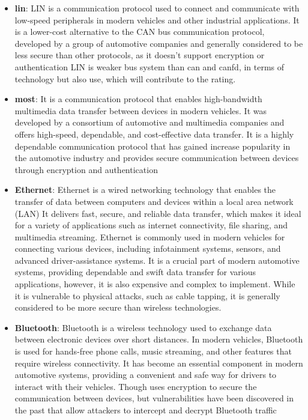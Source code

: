 \begin{itemize}
    \item \textbf{\gls{lin}}: LIN is a communication protocol used to connect and communicate with low-speed peripherals in modern vehicles and other industrial applications. 
    It is a lower-cost alternative to the CAN bus communication protocol, developed by a group of automotive companies 
    and generally considered to be less secure than other protocols, as it doesn't support encryption or authentication
    LIN is weaker bus system than \gls{can} and \gls{canfd}, in terms of technology but also use, which will contribute to the rating.
    
    \item \textbf{\gls{most}}: It is a communication protocol that enables high-bandwidth multimedia data transfer between devices in modern vehicles. 
    It was developed by a consortium of automotive and multimedia companies and offers high-speed, dependable, and cost-effective data transfer.
    It is a highly dependable communication protocol that has gained increase popularity in the automotive industry and
    provides secure communication between devices through encryption and authentication

    \item \textbf{Ethernet}: Ethernet is a wired networking technology that enables the transfer of data between computers and devices within a local area network (LAN)
    It delivers fast, secure, and reliable data transfer, which makes it ideal for a variety of applications such as internet connectivity, file sharing, and multimedia streaming.
    Ethernet is commonly used in modern vehicles for connecting various devices, including infotainment systems, sensors, and advanced driver-assistance systems. 
    It is a crucial part of modern automotive systems, providing dependable and swift data transfer for various applications, however, it is also expensive and complex to implement.
    While it is vulnerable to physical attacks, such as cable tapping, it is generally considered to be more secure than wireless technologies.

    \item \textbf{Bluetooth}: Bluetooth is a wireless technology used to exchange data between electronic devices over short distances.
    In modern vehicles, Bluetooth is used for hands-free phone calls, music streaming, and other features that require wireless connectivity. 
    It has become an essential component in modern automotive systems, providing a convenient and safe way for drivers to interact with their vehicles.
    Though uses encryption to secure the communication between devices, but vulnerabilities have been discovered in the past that allow attackers to intercept and decrypt Bluetooth traffic


\end{itemize}
